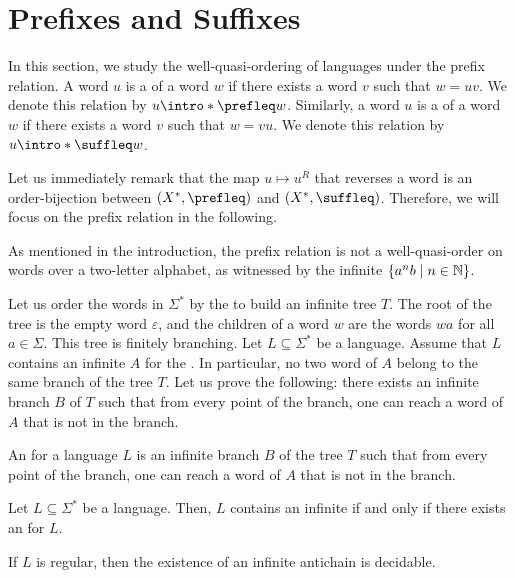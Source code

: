 \section{Prefixes and Suffixes}
\label{prefixes-suffixes:sec}

In this section, we study the well-quasi-ordering of languages under the prefix
relation. A word $u$ is a  of a word $w$ if there exists a word
$v$ such that $w = uv$. We denote this relation by $u \intro*\prefleq w$.
Similarly, a word $u$ is a  of a word $w$ if there exists a word
$v$ such that $w = vu$. We denote this relation by $u \intro*\suffleq w$.

Let us immediately remark that the map $u \mapsto u^R$ that reverses a word is
an order-bijection between $(X^*, \prefleq)$ and $(X^*, \suffleq)$. Therefore,
we will focus on the prefix relation in the following.

As mentioned in the introduction, the prefix relation is not a well-quasi-order
on words over a two-letter alphabet, as witnessed by the infinite
 $\{ a^nb \mid n \in \mathbb{N} \}$. 

Let us order the words in $\Sigma^*$ by the  to build an
infinite tree $T$. The root of the tree is the empty word $\varepsilon$, and
the children of a word $w$ are the words $wa$ for all $a \in \Sigma$. This tree
is finitely branching. Let $L \subseteq \Sigma^*$ be a language. Assume that
$L$ contains an infinite  $A$ for the . In
particular, no two word of $A$ belong to the same branch of the tree $T$. Let
us prove the following: there exists an infinite branch $B$ of $T$ such that from
every point of the branch, one can reach a word of $A$ that is not in the
branch. 

\begin{definition}
    An  for a language $L$ is an infinite 
    branch $B$ of the tree $T$ such that from every point of the branch, 
    one can reach a word of $A$ that is not in the branch.
\end{definition}

\begin{lemma}
    Let $L \subseteq \Sigma^*$ be a language. Then, $L$ contains an infinite
     if and only if there exists an  for $L$.
\end{lemma}

\begin{corollary}
    If $L$ is regular, then the existence of an infinite antichain is decidable.
\end{corollary}

